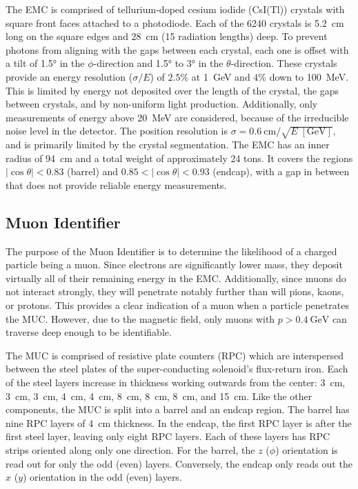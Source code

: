 The EMC is comprised of tellurium-doped cesium iodide (CsI(Tl)) crystals with square front faces attached to a photodiode.
Each of the 6240 crystals is \SI{5.2}{\cm} long on the square edges and \SI{28}{\cm} (15 radiation lengths) deep.
To prevent photons from aligning with the gaps between each crystal, each one is offset with a tilt of \ang{1.5} in the $\phi$-direction and \ang{1.5} to \ang{3} in the $\theta$-direction.
These crystals provide an energy resolution ($\sigma / E$) of $2.5\%$ at \SI{1}{\GeV} and $4\%$ down to \SI{100}{\MeV}.
This is limited by energy not deposited over the length of the crystal, the gaps between crystals, and by non-uniform light production.
Additionally, only measurements of energy above \SI{20}{\MeV} are considered, because of the irreducible noise level in the detector.
The position resolution is $\sigma = \SI{0.6}{\cm} / \sqrt{E \; [\si{\GeV}]}$, and is primarily limited by the crystal segmentation.
The EMC has an inner radius of \SI{94}{\cm} and a total weight of approximately 24 tons.
It covers the regions $|\cos\theta| < 0.83$ (barrel) and $0.85 < |\cos\theta| < 0.93$ (endcap), with a gap in between that does not provide reliable energy measurements.


\subsection{Muon Identifier}
\label{ssec:detector_mu}

The purpose of the Muon Identifier is to determine the likelihood of a charged particle being a muon.
Since electrons are significantly lower mass, they deposit virtually all of their remaining energy in the EMC.
Additionally, since muons do not interact strongly, they will penetrate notably further than will pions, kaons, or protons.
This provides a clear indication of a muon when a particle penetrates the MUC.
However, due to the magnetic field, only muons with $p > \SI{0.4}{\GeV}$ can traverse deep enough to be identifiable.


The MUC is comprised of resistive plate counters (RPC) which are interspersed between the steel plates of the super-conducting solenoid's flux-return iron.
Each of the steel layers increase in thickness working outwards from the center: \SI{3}{\cm}, \SI{3}{\cm}, \SI{3}{\cm}, \SI{4}{\cm}, \SI{4}{\cm}, \SI{8}{\cm}, \SI{8}{\cm}, \SI{8}{\cm}, and \SI{15}{\cm}.
Like the other components, the MUC is split into a barrel and an endcap region.
The barrel has nine RPC layers of \SI{4}{\cm} thickness.
In the endcap, the first RPC layer is after the first steel layer, leaving only eight RPC layers.
Each of these layers has RPC strips oriented along only one direction.
For the barrel, the $z$ ($\phi$) orientation is read out for only the odd (even) layers.
Conversely, the endcap only reads out the $x$ ($y$) orientation in the odd (even) layers.


